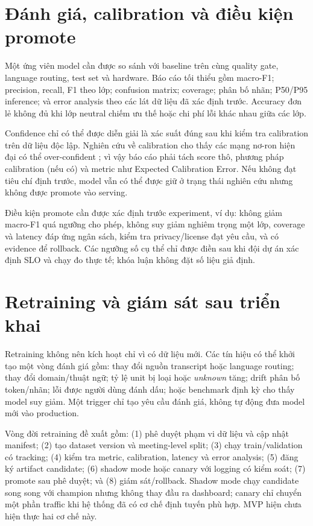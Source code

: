 \section{Đánh giá, calibration và điều kiện promote}
Một ứng viên model cần được so sánh với baseline trên cùng quality gate, language routing, test set và hardware. Báo cáo tối thiểu gồm macro-F1; precision, recall, F1 theo lớp; confusion matrix; coverage; phân bố nhãn; P50/P95 inference; và error analysis theo các lát dữ liệu đã xác định trước. Accuracy đơn lẻ không đủ khi lớp neutral chiếm ưu thế hoặc chi phí lỗi khác nhau giữa các lớp.

Confidence chỉ có thể được diễn giải là xác suất đúng sau khi kiểm tra calibration trên dữ liệu độc lập. Nghiên cứu về calibration cho thấy các mạng nơ-ron hiện đại có thể over-confident \cite{guo2017}; vì vậy báo cáo phải tách score thô, phương pháp calibration (nếu có) và metric như Expected Calibration Error. Nếu không đạt tiêu chí định trước, model vẫn có thể được giữ ở trạng thái nghiên cứu nhưng không được promote vào serving.

Điều kiện promote cần được xác định trước experiment, ví dụ: không giảm macro-F1 quá ngưỡng cho phép, không suy giảm nghiêm trọng một lớp, coverage và latency đáp ứng ngân sách, kiểm tra privacy/license đạt yêu cầu, và có evidence để rollback. Các ngưỡng số cụ thể chỉ được điền sau khi đội dự án xác định SLO và chạy đo thực tế; khóa luận không đặt số liệu giả định.

\section{Retraining và giám sát sau triển khai}
Retraining không nên kích hoạt chỉ vì có dữ liệu mới. Các tín hiệu có thể khởi tạo một vòng đánh giá gồm: thay đổi nguồn transcript hoặc language routing; thay đổi domain/thuật ngữ; tỷ lệ unit bị loại hoặc \textit{unknown} tăng; drift phân bố token/nhãn; lỗi được người dùng đánh dấu; hoặc benchmark định kỳ cho thấy model suy giảm. Một trigger chỉ tạo yêu cầu đánh giá, không tự động đưa model mới vào production.

Vòng đời retraining đề xuất gồm: (1) phê duyệt phạm vi dữ liệu và cập nhật manifest; (2) tạo dataset version và meeting-level split; (3) chạy train/validation có tracking; (4) kiểm tra metric, calibration, latency và error analysis; (5) đăng ký artifact candidate; (6) shadow mode hoặc canary với logging có kiểm soát; (7) promote sau phê duyệt; và (8) giám sát/rollback. Shadow mode chạy candidate song song với champion nhưng không thay đầu ra dashboard; canary chỉ chuyển một phần traffic khi hệ thống đã có cơ chế định tuyến phù hợp. MVP hiện chưa hiện thực hai cơ chế này.

